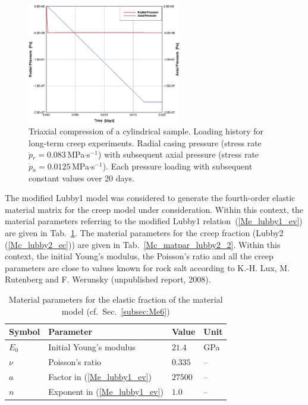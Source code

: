 
\begin{figure}[!htb]
\begin{center}
\includegraphics[width=0.6\textwidth]{PART_II/M/svvcreep_e_HL_loadhistory.eps}
\end{center}
\caption{Triaxial compression of a cylindrical sample. Loading history for long-term creep experiments. Radial casing pressure (stress rate $\dot{p}{}_r=0.083$\,MPa$\cdot$s$^{-1}$) with subsequent axial pressure (stress rate $\dot{p}{}_a=0.0125$\,MPa$\cdot$s$^{-1}$). Each pressure loading with subsequent constant values over 20 days.} 
\label{Mc_triax_loadhist_lubby2}
\end{figure}

The modified Lubby1 model was considered to generate the fourth-order elastic material matrix for the creep model under consideration. Within this context, the material parameters referring to the modified Lubby1 relation~(\ref{Me_lubby1_ev}) are given in Tab.~\ref{Mc_matpar_lubby2_1}. The material parameters for the creep fraction (Lubby2 (\ref{Mc_lubby2_ec})) are given in Tab.~\ref{Mc_matpar_lubby2_2}. Within this context, the initial Young's modulus, the Poisson's ratio and all the creep parameters are close to values known for rock salt according to K.-H. Lux, M. Rutenberg and F. Werunsky (unpublished report, 2008). 
 
\begin{table}[!htb]
\centering
\caption{Material parameters for the elastic fraction of the material model (cf.~Sec.~\ref{subsec:Me6})}
\label{Mc_matpar_lubby2_1}
\begin{tabular}{llll}
\toprule
Symbol & Parameter & Value & Unit \\
\midrule
$E_0$    & Initial Young's modulus          & $21.4$  & GPa \\
$\nu$    & Poisson's ratio                  & $0.335$ & -- \\
$a$      & Factor in (\ref{Me_lubby1_ev})   & $27500$ & -- \\
$n$      & Exponent in (\ref{Me_lubby1_ev}) & $1.0$   & -- \\
\bottomrule
\end{tabular}
\end{table}
 
